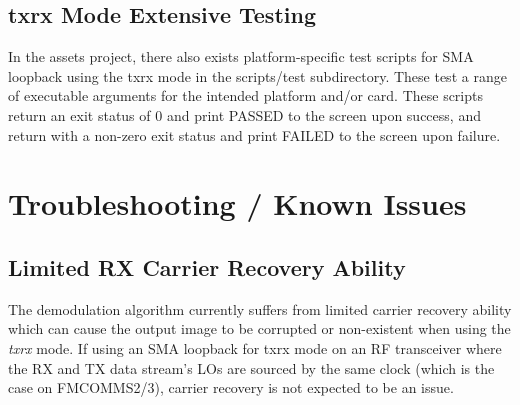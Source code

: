   \subsection{txrx Mode Extensive Testing}
    In the assets project, there also exists platform-specific test scripts for
    SMA loopback using the txrx mode in
    the scripts/test subdirectory. These test a range of executable arguments
    for the intended platform and/or card. These scripts return an exit
    status of 0 and print PASSED to the screen upon success, and return
    with a non-zero exit status and print FAILED to the screen upon failure.

\pagebreak

\section{Troubleshooting / Known Issues}

  \subsection{Limited RX Carrier Recovery Ability} %

    The demodulation algorithm currently suffers from limited carrier
    recovery ability which can cause the output image to be corrupted or
    non-existent
    when using the \textit{txrx} mode.
    If using an SMA loopback for txrx mode
    on an RF transceiver where the RX and TX data stream's LOs are sourced by
    the same clock (which is the case on FMCOMMS2/3), carrier recovery is not
    expected to be an issue.

